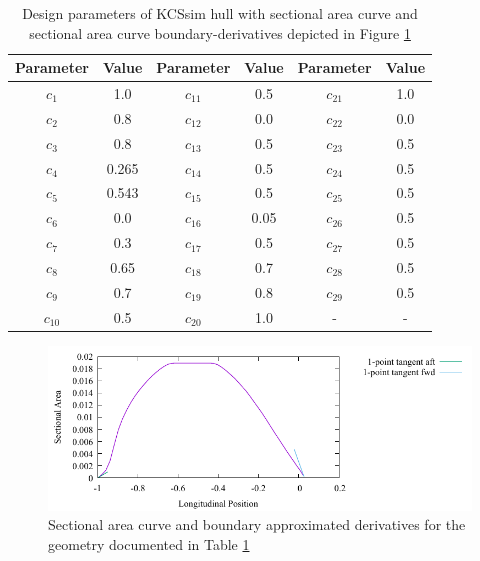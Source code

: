 \documentclass{report}
\begin{document}
\begin{table}[H]
    \centering
    \begin{tabular}{|c|c|c|c|c|c|}
        \hline 
        Parameter & Value & Parameter & Value & Parameter & Value\\
        \hline 
        $c_1$ & 1.0 & $c_{11}$ & 0.5 & $c_{21}$ & 1.0 \\
        \hline 
        $c_2$ & 0.8 & $c_{12}$ & {\color{blue} 0.0} & $c_{22}$ & 0.0\\
        \hline 
        $c_3$ & 0.8 & $c_{13}$ & 0.5 & $c_{23}$ & 0.5 \\
        \hline 
        $c_4$ & 0.265 & $c_{14}$ & 0.5 & $c_{24}$ & 0.5 \\
        \hline 
        $c_5$ & 0.543 & $c_{15}$ & 0.5 & $c_{25}$ & 0.5 \\
        \hline 
        $c_6$ & 0.0 & $c_{16}$ & 0.05 & $c_{26}$ & 0.5 \\
        \hline 
        $c_7$ & 0.3 & $c_{17}$ & 0.5 & $c_{27}$ & 0.5 \\
        \hline 
        $c_8$ & 0.65 & $c_{18}$ & 0.7 & $c_{28}$ & 0.5 \\
        \hline 
        $c_9$ & 0.7 & $c_{19}$ & 0.8 & $c_{29}$ & 0.5 \\
        \hline 
        $c_{10}$ & 0.5 & $c_{20}$ & 1.0 & - & - \\
        \hline 
    \end{tabular}
    \caption{Design parameters of KCSsim hull with sectional area curve and 
    sectional area curve boundary-derivatives depicted in Figure
    \ref{fig:test-4-sac-5}}
    \label{tab:test-4-5}
\end{table}
\begin{figure}[H]
    \centering
    \includegraphics[width = 0.7\linewidth]{figures/test-4-sac-5.pdf}
    \caption{Sectional area curve and boundary approximated derivatives for
    the geometry documented in Table \ref{tab:test-4-5}}
    \label{fig:test-4-sac-5}
\end{figure}
\end{document}
